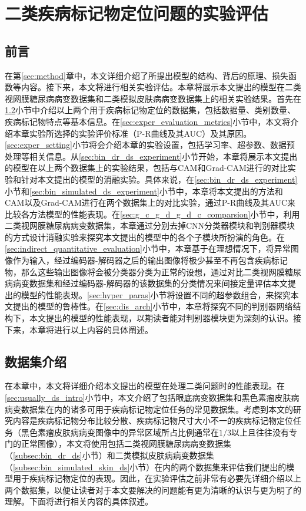 \chapter{二类疾病标记物定位问题的实验评估}\label{sec:experiments}
\section{前言}
在第\ref{sec:method}章中，本文详细介绍了所提出模型的结构、背后的原理、损失函数等内容。接下来，本文将进行相关实验评估。本章将展示本文提出的模型在二类视网膜糖尿病病变数据集和二类模拟皮肤病病变数据集上的相关实验结果。首先在\ref{sec:exper_ds_intro}小节中介绍以上两个用于疾病标记物定位的数据集，包括数据量、类别数量、疾病标记物特点等基本信息。在\ref{sec:exper_evaluation_metrics}小节中，本文将介绍本章实验所选择的实验评价标准（P-R曲线及其AUC）及其原因。\ref{sec:exper_setting}小节将会介绍本章的实验设置，包括学习率、超参数、数据预处理等相关信息。从\ref{sec:bin_dr_ds_experiment}小节开始，本章将展示本文提出的模型在以上两个数据集上的实验结果，包括与CAM和Grad-CAM进行的对比实验和针对本文提出的模型的消融实验。具体来说，在\ref{sec:bin_dr_ds_experiment}小节和\ref{sec:bin_simulated_ds_experiment}小节中，本章将本文提出的方法和CAM以及Grad-CAM进行在两个数据集上的对比实验，通过P-R曲线及其AUC来比较各方法模型的性能表现。在\ref{sec:g_c_g_d_g_d_c_comparsion}小节中，利用二类视网膜糖尿病病变数据集，本章通过分别去掉CNN分类器模块和判别器模块的方式设计消融实验来探究本文提出的模型中的各个子模块所扮演的角色。在\ref{sec:indirect_quantitative_evaluation}小节中，本章基于在理想情况下，将异常图像作为输入，经过编码器-解码器之后的输出图像将极少甚至不再包含疾病标记物，那么这些输出图像将会被分类器分类为正常的设想，通过对比二类视网膜糖尿病病变数据集和经过编码器-解码器的该数据集的分类情况来间接定量评估本文提出的模型的性能表现。\ref{sec:hyper_paras}小节将设置不同的超参数组合，来探究本文提出的模型的鲁棒性。在\ref{sec:dis_arch}小节中，本章将探究不同的判别器网络结构下，本文提出的模型的性能表现，以期读者能对判别器模块更为深刻的认识。接下来，本章将进行以上内容的具体阐述。
\section{数据集介绍}\label{sec:exper_ds_intro}
在本章中，本文将详细介绍本文提出的模型在处理二类问题时的性能表现。在\ref{sec:usually_ds_intro}小节中，本文介绍了包括眼底病变数据集和黑色素瘤皮肤病病变数据集在内的诸多可用于疾病标记物定位任务的常见数据集。考虑到本文的研究内容是疾病标记物分布比较分散、疾病标记物尺寸大小不一的疾病标记物定位任务（黑色素瘤皮肤病病变图像中的异常区域所占比例通常在$1/3$以上且往往没有专门的正常图像），本文将使用包括二类视网膜糖尿病病变数据集（\ref{subsec:bin_dr_ds}小节）和二类模拟皮肤病病变数据集（\ref{subsec:bin_simulated_skin_ds}小节）在内的两个数据集来评估我们提出的模型用于疾病标记物定位的表现。因此，在实验评估之前非常有必要先详细介绍以上两个数据集，以便让读者对于本文要解决的问题能有更为清晰的认识与更为明了的理解。下面将进行相关内容的具体叙述。
